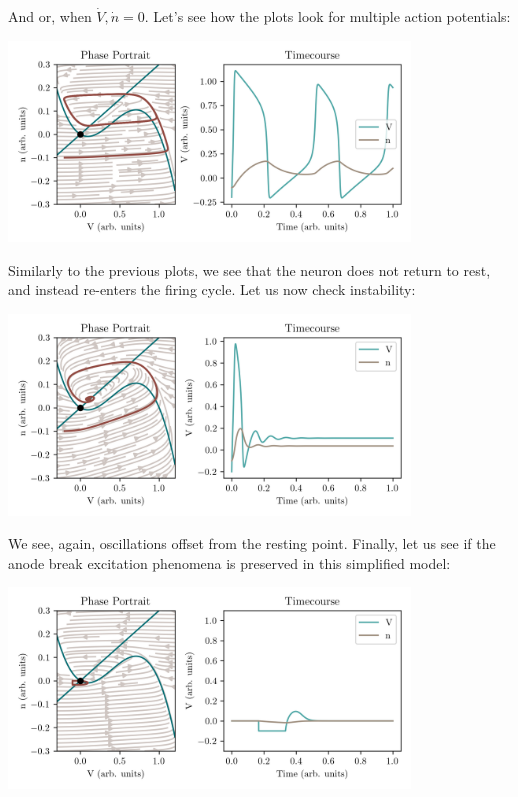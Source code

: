 And or, when $\dot{V}, \dot{n} = 0$. Let's see how the plots look for multiple action potentials: 

\begin{center}
\includegraphics[width=0.8\textwidth]{images/models/fhnphase2.png}
\end{center}

Similarly to the previous plots, we see that the neuron does not return to rest, and instead re-enters the firing cycle. Let us now check instability: 

\begin{center}
\includegraphics[width=0.8\textwidth]{images/models/fhnphase3.png}
\end{center}

We see, again, oscillations offset from the resting point. Finally, let us see if the anode break excitation phenomena is preserved in this simplified model:

\begin{center}
\includegraphics[width=0.8\textwidth]{images/models/fhnanode1.png}
\end{center}


